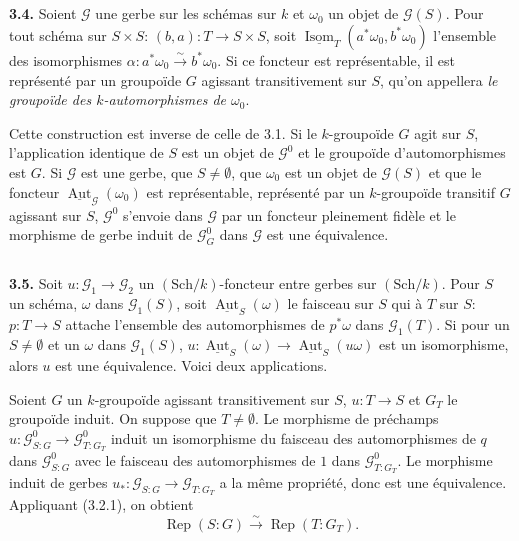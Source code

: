 \documentclass[12pt,a4paper]{article}
\theoremstyle{plain}
\theoremstyle{definition}
\theoremstyle{remark}
\DeclareMathOperator{\Aut}{Aut}
\DeclareMathOperator{\Isom}{Isom}
\DeclareMathOperator{\Rep}{Rep}
\begin{document}
\subsection{}

\textbf{3.4.} Soient $\mathcal{G}$ une gerbe sur les schémas sur $k$ et $\omega_0$ un objet de $\mathcal{G}(S)$. Pour tout schéma sur $S \times S$: $(b,a) : T \to S \times S$, soit $\underline{\Isom}_T(a^*\omega_0, b^*\omega_0)$ l'ensemble des isomorphismes $\alpha : a^*\omega_0 \xrightarrow{\sim} b^*\omega_0$. Si ce foncteur est représentable, il est représenté par un groupoïde $G$ agissant transitivement sur $S$, qu'on appellera \emph{le groupoïde des $k$-automorphismes de $\omega_0$}.

Cette construction est inverse de celle de 3.1. Si le $k$-groupoïde $G$ agit sur $S$, l'application identique de $S$ est un objet de $\mathcal{G}^0$ et le groupoïde d'automorphismes est $G$. Si $\mathcal{G}$ est une gerbe, que $S \neq \emptyset$, que $\omega_0$ est un objet de $\mathcal{G}(S)$ et que le foncteur $\underline{\Aut}_{\mathcal{G}}(\omega_0)$ est représentable, représenté par un $k$-groupoïde transitif $G$ agissant sur $S$, $\mathcal{G}^0$ s'envoie dans $\mathcal{G}$ par un foncteur pleinement fidèle et le morphisme de gerbe induit de $\mathcal{G}^0_G$ dans $\mathcal{G}$ est une équivalence.

\subsection{}

\textbf{3.5.} Soit $u : \mathcal{G}_1 \to \mathcal{G}_2$ un $(\mathrm{Sch}/k)$-foncteur entre gerbes sur $(\mathrm{Sch}/k)$. Pour $S$ un schéma, $\omega$ dans $\mathcal{G}_1(S)$, soit $\underline{\Aut}_S(\omega)$ le faisceau sur $S$ qui à $T$ sur $S$: $p : T \to S$ attache l'ensemble des automorphismes de $p^*\omega$ dans $\mathcal{G}_1(T)$. Si pour un $S \neq \emptyset$ et un $\omega$ dans $\mathcal{G}_1(S)$, $u : \underline{\Aut}_S(\omega) \to \underline{\Aut}_S(u\omega)$ est un isomorphisme, alors $u$ est une équivalence. Voici deux applications.

Soient $G$ un $k$-groupoïde agissant transitivement sur $S$, $u : T \to S$ et $G_T$ le groupoïde induit. On suppose que $T \neq \emptyset$. Le morphisme de préchamps $u : \mathcal{G}^0_{S:G} \to \mathcal{G}^0_{T:G_T}$ induit un isomorphisme du faisceau des automorphismes de $q$ dans $\mathcal{G}^0_{S:G}$ avec le faisceau des automorphismes de $1$ dans $\mathcal{G}^0_{T:G_T}$. Le morphisme induit de gerbes $u_* : \mathcal{G}_{S:G} \to \mathcal{G}_{T:G_T}$ a la même propriété, donc est une équivalence. Appliquant (3.2.1), on obtient
\begin{equation}\label{eq:3.5.1}
\Rep(S:G) \xrightarrow{\sim} \Rep(T:G_T).
\end{equation}
\end{document}

